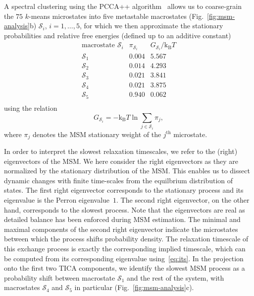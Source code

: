 \documentclass[9pt,tutorial]{livecoms}
\begin{document}
A spectral clustering using the PCCA++ algorithm~\cite{pcca++,Deuflhard2005-pcca,Kube2007-pcca+} allows us to coarse-grain the $75$ $k$-means microstates into five metastable macrostates (Fig.~\ref{fig:msm-analysis}b) $\mathcal{S}_i$, $i=1,\dots,5$, for which we then approximate the stationary probabilities and relative free energies (defined up to an additive constant)
\[ \begin{array}{ccc}
\textrm{macrostate } \mathcal{S}_i & \pi_{\mathcal{S}_i} & G_{\mathcal{S}_i} / \textrm{k}_\textrm{B} T \\
\hline
\mathcal{S}_1 & 0.004 & 5.567 \\
\mathcal{S}_2 & 0.014 & 4.293 \\
\mathcal{S}_3 & 0.021 & 3.841 \\
\mathcal{S}_4 & 0.021 & 3.875 \\
\mathcal{S}_5 & 0.940 & 0.062 \\
\end{array}\]
using the relation
\begin{equation}
\label{eq:fe}
G_{\mathcal{S}_i} = - \textrm{k}_\textrm{B} T \ln \sum\limits_{j\in \mathcal{S}_i} \pi_j,
\end{equation}
where $\pi_j$ denotes the MSM stationary weight of the $j^\textrm{th}$ microstate.

In order to interpret the slowest relaxation timescales, we refer to the (right) eigenvectors of the MSM. We here consider the right eigenvectors as they are normalized by the stationary distribution of the MSM. This enables us to dissect dynamic changes with finite time-scales from the equilbrium distribution of states.
The first right eigenvector corresponds to the stationary process and its eigenvalue is the Perron eigenvalue~$1$.
The second right eigenvector, on the other hand, corresponds to the slowest process. Note that the eigenvectors are real as detailed balance has been enforced during MSM estimation.
The minimal and maximal components of the second right eigenvector indicate the microstates between which the process shifts probability density.
The relaxation timescale of this exchange process is exactly the corresponding implied timescale, which can be computed from its corresponding eigenvalue using~\eqref{eq:its}.
In the projection onto the first two TICA components, we identify the slowest MSM process as a probability shift between macrostate $\mathcal{S}_1$ and the rest of the system, with macrostates $\mathcal{S}_4$ and $\mathcal{S}_5$ in particular (Fig.~\ref{fig:msm-analysis}c).
\end{document}
